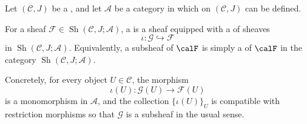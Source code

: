 \begin{definition} \label{definition:subsheaf_of_a_sheaf_on_a_site}
Let $(\mathcal{C}, J)$ be a , and let $\mathcal{A}$ be a category in which  on $(\mathcal{C}, J)$ can be defined.

For a sheaf $\mathcal{F} \in \operatorname{Sh}(\mathcal{C}, J; \mathcal{A})$, a  is a sheaf equipped with a  of sheaves
$$\iota : \mathcal{G} \hookrightarrow \mathcal{F}$$
in $\operatorname{Sh}(\mathcal{C}, J; \mathcal{A})$. Equivalently, a subsheaf of $\calF$ is simply a  of $\calF$ in the category $\operatorname{Sh}(\mathcal{C}, J; \mathcal{A})$.

Concretely, for every object $U \in \mathcal{C}$, the morphism
\[ \iota(U) : \mathcal{G}(U) \to \mathcal{F}(U) \]
is a monomorphism in $\mathcal{A}$, and the collection $\{ \iota(U) \}_U$ is compatible with restriction morphisms so that $\mathcal{G}$ is a subsheaf in the usual sense.
\end{definition}